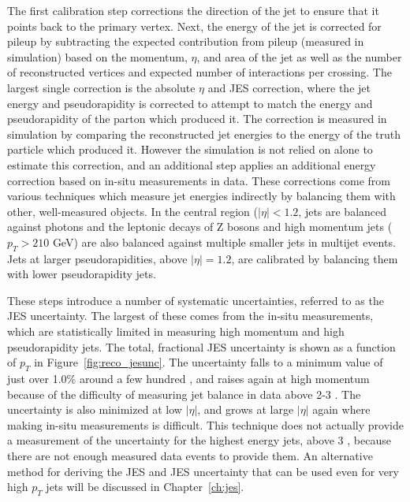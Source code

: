The first calibration step corrections the direction of the jet to ensure that it points back to the primary vertex.
Next, the energy of the jet is corrected for pileup by subtracting the expected contribution from pileup (measured in simulation) based on the momentum, $\eta$, and area of the jet as well as the number of reconstructed vertices and expected number of interactions per crossing.
The largest single correction is the absolute $\eta$ and \ac{JES} correction, where the jet energy and pseudorapidity is corrected to attempt to match the energy and pseudorapidity of the parton which produced it.
The correction is measured in simulation by comparing the reconstructed jet energies to the energy of the truth particle which produced it.
However the simulation is not relied on alone to estimate this correction, and an additional step applies an additional energy correction based on in-situ measurements in data.
These corrections come from various techniques which measure jet energies indirectly by balancing them with other, well-measured objects.
In the central region ($|\eta| < 1.2$, jets are balanced against photons and the leptonic decays of Z bosons and high momentum jets ($p_T > 210$ GeV) are also balanced against multiple smaller jets in multijet events.
Jets at larger pseudorapidities, above $|\eta| = 1.2$, are calibrated by balancing them with lower pseudorapidity jets.

These steps introduce a number of systematic uncertainties, referred to as the \ac{JES} uncertainty.
The largest of these comes from the in-situ measurements, which are statistically limited in measuring high momentum and high pseudorapidity jets.
The total, fractional \ac{JES} uncertainty is shown as a function of $p_T$ in Figure~\ref{fig:reco_jesunc}.
The uncertainty falls to a minimum value of just over 1.0\% around a few hundred \GeV, and raises again at high momentum because of the difficulty of measuring jet balance in data above 2-3 \TeV.
The uncertainty is also minimized at low $|\eta|$, and grows at large $|\eta|$ again where making in-situ measurements is difficult.
This technique does not actually provide a measurement of the uncertainty for the highest energy jets, above 3 \TeV, because there are not enough measured data events to provide them.
An alternative method for deriving the \ac{JES} and \ac{JES} uncertainty that can be used even for very high $p_T$ jets will be discussed in Chapter~\ref{ch:jes}.

